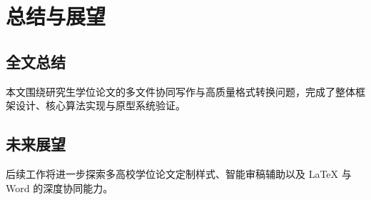 \chapter{总结与展望}
\label{chap:conclusion}

\section{全文总结}
本文围绕研究生学位论文的多文件协同写作与高质量格式转换问题，完成了整体框架设计、核心算法实现与原型系统验证。

\section{未来展望}
后续工作将进一步探索多高校学位论文定制样式、智能审稿辅助以及 LaTeX 与 Word 的深度协同能力。
